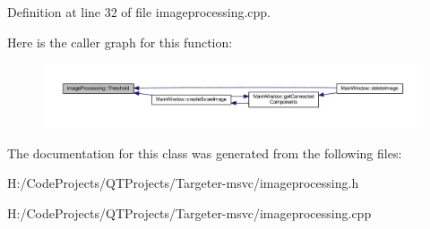 Definition at line 32 of file imageprocessing.\+cpp.

Here is the caller graph for this function\+:
\nopagebreak
\begin{figure}[H]
\begin{center}
\leavevmode
\includegraphics[width=350pt]{class_image_processing_ae664598cc3952b81d2bbe59dfd0f0d94_icgraph}
\end{center}
\end{figure}


The documentation for this class was generated from the following files\+:\begin{DoxyCompactItemize}
\item 
H\+:/\+Code\+Projects/\+Q\+T\+Projects/\+Targeter-\/msvc/imageprocessing.\+h\item 
H\+:/\+Code\+Projects/\+Q\+T\+Projects/\+Targeter-\/msvc/imageprocessing.\+cpp\end{DoxyCompactItemize}
